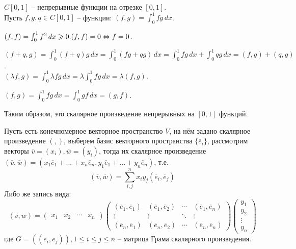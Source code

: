 	\begin{Example}
	  $C[0, 1]$ -- непрерывные функции на отрезке $[0, 1]$.\\
	  Пусть $f, g, q \in C[0, 1]$ -- функции: $(f, g) = \int_0^1 fg \,dx$.
	  \begin{MyList}
		\item $(f, f) = \int_0^1 f^2 \,dx \geqslant 0. \\
		(f, f) = 0  \Leftrightarrow f = 0$.
		\item $(f + q, g) = \int_0^1 (f + q)g \,dx = \int_0^1 (fg + qg) \,dx = \int_0^1 fg \,dx + \int_0^1 qg \,dx = (f, g) + (q, g)$. \\
		$(\lambda f, g) =\int_0^1 \lambda fg \,dx  = \lambda \int_0^1 fg \,dx = \lambda(f, g)$.
		\item $(f, g) =\int_0^1 fg \,dx  = \int_0^1 gf \,dx = (g, f)$.
	  \end{MyList}
	  Таким образом, это скалярное произведение непрерывных на $[0, 1]$ функций.
	\end{Example}
  
	Пусть есть конечномерное векторное пространство $V$, на нём задано скалярное произведение $(,)$, выберем базис векторного пространства $\{\overline{e}_i\}$, рассмотрим векторы $\overline{v} = (x_i), \overline{w} = (y_i)$, 
	тогда их скалярное произведение $(\overline{v}, \overline{w}) = (x_1 \overline{e}_1 + ... + x_n \overline{e}_n, y_1 \overline{e}_1 + ... + y_n\overline{e}_n)$, т.е.
	$$(\overline{v}, \overline{w}) = \sum_{i, j}^n x_i y_j (\overline{e}_i, \overline{e}_j)$$
	Либо же запись вида:
	\[(\overline{v}, \overline{w}) = \left(\begin{array}{cccc}
	  x_1 & x_2 & \cdots & x_n
	  \end{array}\right)
	   \left(\begin{array}{cccc}
	  (\overline{e}_1, \overline{e}_1) & (\overline{e}_1, \overline{e}_2) & \cdots & (\overline{e}_1, \overline{e}_n) \\ 
	  \vdots & \vdots & \ddots & \vdots \\
	  (\overline{e}_n, \overline{e}_1) & (\overline{e}_n, \overline{e}_2) & \cdots & (\overline{e}_n, \overline{e}_n)
	  \end{array}\right) 
	  \left(\begin{array}{c}
		  y_1 \\ 
		  y_2 \\ 
		  \vdots \\ 
		  y_n
		  \end{array}\right)\] 
	  где $G = ((\overline{e}_i, \overline{e}_j)), {1 \leqslant i \leqslant j \leqslant n}$ -- матрица Грама скалярного произведения.
	  
